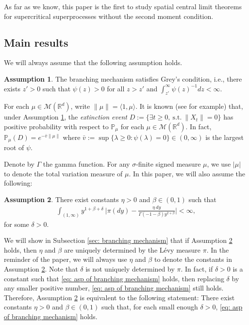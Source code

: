 \documentclass[12pt,a4paper]{amsart}
\theoremstyle{plain}
\theoremstyle{definition}
\newtheorem{asp}{Assumption}
\numberwithin{equation}{section}
\begin{document}
As far as we know, this paper is the first to study spatial central limit theorems for supercritical superprocesses without the second moment condition.

\subsection{Main results}
\label{sec:I:R}
We will always assume that the following assumption holds.
\begin{asp}
  \label{asp: Greys condition}
  The branching mechanism satisfies Grey's condition, i.e., there exists $z' > 0$ such that $\psi(z) > 0$ for all $z>z'$ and  $\int_{z'}^\infty \psi(z)^{-1}dz < \infty$.
\end{asp}
For each $\mu \in \mathcal M(\mathbb R^d)$, write $\|\mu\| = \langle 1, \mu\rangle$.
It is known (see \cite[Theorems 12.5 \& 12.7]{Kyprianou2014Fluctuations} for example) that, under Assumption \ref{asp: Greys condition}, the \emph{extinction event} $D :=\{\exists t\geq 0,~\text{s.t.}~ \|X_t\| =0 \}$ has positive probability with respect to $\mathbb P_\mu$ for each  $\mu \in \mathcal M(\mathbb R^d)$.
In fact, $ \mathbb{P}_{\mu} (D) = e^{-\bar v \|\mu\|}$ where $ \bar v := \sup\{\lambda \geq 0: \psi(\lambda) = 0\} \in (0,\infty) $ is the largest root of $\psi$.

Denote by $\Gamma$ the gamma function.
For any $\sigma$-finite signed measure $\mu$, we use $|\mu|$ to denote the total variation measure of $\mu$.
In this paper, we will also assume the following:
\begin{asp}
  \label{asp: branching mechanism}
  There exist constants $\eta > 0$ and $\beta \in (0,1)$ such that
  \begin{align}
    \label{eq: asp of branching mechanism}
    \int_{(1,\infty)}y^{1+\beta +\delta}~\Big|\pi(dy)-\frac{\eta~dy}{\Gamma(-1-\beta)y^{2+\beta}}\Big| <\infty,
  \end{align}
	for some $\delta > 0$.
\end{asp}
We will show in Subsection \ref{sec: branching mechanism} that if Assumption \ref{asp: branching mechanism} holds, then $\eta$ and $\beta$ are uniquely determined by the L\'evy measure $\pi$.
In the reminder of the paper, we will always use $\eta$ and $\beta$ to denote the constants in Assumption  \ref{asp: branching mechanism}.
	Note that $\delta$ is not uniquely determined by $\pi$.
	In fact, if $\delta>0$ is a constant such that \eqref{eq: asp of branching mechanism} holds, then replacing $\delta$ by any smaller positive number, \eqref{eq: asp of branching mechanism} still holds.
	Therefore, Assumption \ref{asp: branching mechanism} is equivalent to the following statement:
	There exist constants $\eta > 0$ and $\beta \in (0,1)$ such that, for each small enough $\delta>0$, \eqref{eq: asp of branching mechanism} holds.
\end{document}
